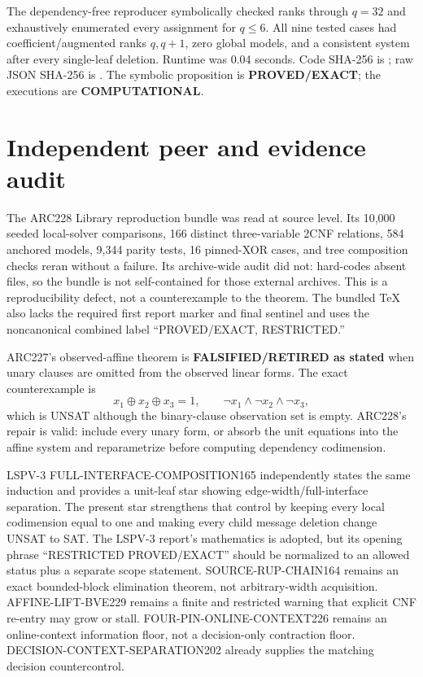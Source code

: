 \documentclass[11pt]{article}
\begin{document}
The dependency-free reproducer symbolically checked ranks through $q=32$ and
exhaustively enumerated every assignment for $q\le6$.  All nine tested cases
had coefficient/augmented ranks $q,q+1$, zero global models, and a consistent
system after every single-leaf deletion.  Runtime was 0.04 seconds.  Code
SHA-256 is
\texttt{};
raw JSON SHA-256 is
\texttt{}.
The symbolic proposition is \textbf{PROVED/EXACT}; the executions are
\textbf{COMPUTATIONAL}.

\section{Independent peer and evidence audit}
The ARC228 Library reproduction bundle was read at source level.  Its 10,000
seeded local-solver comparisons, 166 distinct three-variable 2CNF relations,
584 anchored models, 9,344 parity tests, 16 pinned-XOR cases, and tree
composition checks reran without a failure.  Its archive-wide audit did not:
 hard-codes absent
 files, so the bundle is not
self-contained for those external archives.  This is a reproducibility defect,
not a counterexample to the theorem.  The bundled TeX also lacks the required
first report marker and final sentinel and uses the noncanonical combined
label ``PROVED/EXACT, RESTRICTED.''

ARC227's observed-affine theorem is \textbf{FALSIFIED/RETIRED as stated} when
unary clauses are omitted from the observed linear forms.  The exact
counterexample is
\[
 x_1\oplus x_2\oplus x_3=1,
 \qquad \neg x_1\land\neg x_2\land\neg x_3,
\]
which is UNSAT although the binary-clause observation set is empty.  ARC228's
repair is valid: include every unary form, or absorb the unit equations into
the affine system and reparametrize before computing dependency codimension.

LSPV-3 FULL-INTERFACE-COMPOSITION165 independently states the same induction
and provides a unit-leaf star showing edge-width/full-interface separation.
The present star strengthens that control by keeping every local codimension
equal to one and making every child message deletion change UNSAT to SAT.
The LSPV-3 report's mathematics is adopted, but its opening phrase
``RESTRICTED PROVED/EXACT'' should be normalized to an allowed status plus a
separate scope statement.  SOURCE-RUP-CHAIN164 remains an exact bounded-block
elimination theorem, not arbitrary-width acquisition.  AFFINE-LIFT-BVE229
remains a finite and restricted warning that explicit CNF re-entry may grow or
stall.  FOUR-PIN-ONLINE-CONTEXT226 remains an online-context information
floor, not a decision-only contraction floor.  DECISION-CONTEXT-SEPARATION202
already supplies the matching decision countercontrol.
\end{document}
